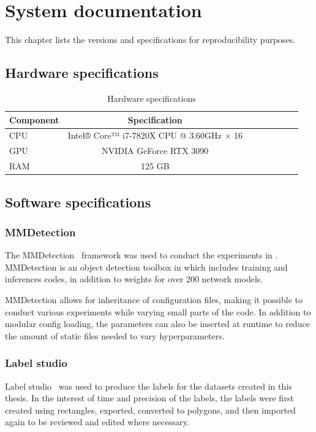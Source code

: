 \documentclass[oneside, english, bibtex]{kththesis}
\begin{document}
\section{System documentation}
\label{sec:sysdoc}

This chapter lists the versions and specifications for reproducibility purposes.

\subsection{Hardware specifications}

\begin{table}[!ht]
  \begin{center}
    \caption{Hardware specifications}
        \begin{tabular}{l*{6}{c}r}
        \label{tab:hardwarestats}
        \textbf{Component} & \textbf{Specification} & \\
        \hline
        CPU & Intel® Core™ i7-7820X CPU @ 3.60GHz × 16 & \\
        GPU & NVIDIA GeForce RTX 3090 & \\
        RAM & 125 GB \\
        \end{tabular}
  \end{center}
\end{table}


\subsection{Software specifications}

\subsubsection{MMDetection}
\label{subsub:MMDetection}
The MMDetection~\cite{DBLP:journals/corr/abs-1906-07155} framework was used to conduct the experiments in .
MMDetection is an object detection toolbox in which includes training and inferences codes, in addition to weights for over 200 network models.

MMDetection allows for inheritance of configuration files, making it possible to conduct various experiments while varying small parts of the code.
In addition to modular config loading, the parameters can also be inserted at runtime to reduce the amount of static files needed to vary hyperparameters.

\subsubsection{Label studio}
Label studio~\cite{Label_Studio} was used to produce the labels for the datasets created in this thesis. In the interest of time and precision of the labels, the labels were first created using rectangles, exported, converted to polygons, and then imported again to be reviewed and edited where necessary. 
\end{document}
